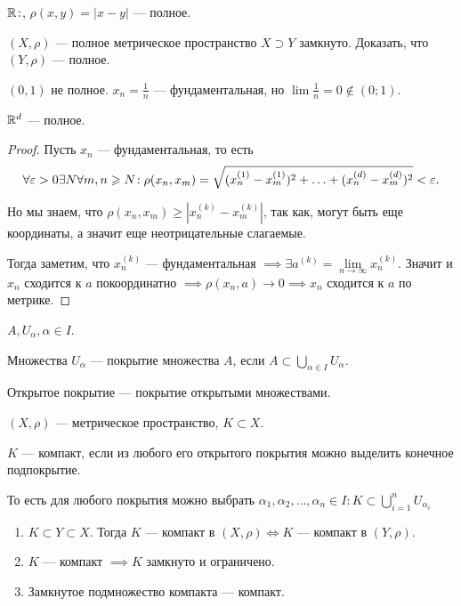 \begin{example}
    $\mathbb{R}\!:$,  $\rho(x, y) = |x-y|$ --- полное.
\end{example}
\begin{exerc}
    $(X, \rho)$ --- полное метрическое пространство  $X \supset Y$ замкнуто. Доказать, что  $(Y, \rho)$ --- полное.
\end{exerc}
\begin{example}
    $(0, 1)$ не полное.  $x_n = \frac{1}{n}$ --- фундаментальная, но $\lim \frac{1}{n} = 0 \notin (0; 1)$.
\end{example}
\begin{theorem}
    $\mathbb{R}^d$ --- полное.
\end{theorem}
\begin{proof}
    Пусть $x_n$ --- фундаментальная, то есть
     \[
    \forall \varepsilon > 0 \exists N \forall m,n \geqslant N\!: \rho(x_n, x_m) = \sqrt{(x_n^{(1)}-x_m^{(1)})^2 + \ldots + (x_n^{(d)}-x_m^{(d)})^2} < \varepsilon
    .\] 

    Но мы знаем, что $\rho(x_n, x_m) \ge |x_n^{(k)} - x_m^{(k)}|$, так как, могут быть еще координаты, а значит еще неотрицательные слагаемые. 

    Тогда заметим, что $x_n^{(k)}$ --- фундаментальная  $\implies \exists a^{(k)} = \lim\limits_{n \to \infty} x_n^{(k)}$. Значит и  $x_n$ сходится к  $a$ покоординатно  $\implies \rho(x_n, a) \to 0 \implies x_n$ сходится к  $a$ по метрике.
\end{proof}
\begin{definition}
    $A, U_\alpha, \alpha \in I$.

    Множества  $U_\alpha$ --- покрытие множества  $A$, если  $A \subset \bigcup\limits_{\alpha \in I} U_\alpha$.
\end{definition}
\begin{definition}
    Открытое покрытие --- покрытие открытыми множествами.
\end{definition}
\begin{definition}
    $(X, \rho)$ --- метрическое пространство, $K \subset X$.

    $K$ --- компакт, если из любого его открытого покрытия можно выделить конечное подпокрытие. 
\end{definition}
    То есть для любого покрытия можно выбрать $\alpha_1, \alpha_2, \ldots, \alpha_n \in I\!: K \subset\bigcup \limits_{i=1}^n U_{\alpha_i}$
\begin{theorem}
    \begin{enumerate}
        \item $K \subset Y \subset X$. Тогда  $K$ --- компакт в  $(X, \rho) \iff K$ --- компакт в  $(Y, \rho)$.
        \item  $K$ --- компакт  $\implies K$ замкнуто и ограничено.
        \item  Замкнутое подмножество компакта --- компакт.
    \end{enumerate}
\end{theorem}
